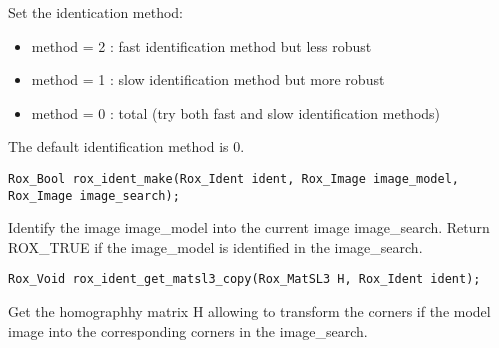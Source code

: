 \noindent Set the identication method:
\begin{itemize}
\item method = 2 : fast identification method but less robust
\item method = 1 : slow identification method but more robust
\item method = 0 : total (try both fast and slow identification methods)
\end{itemize}
The default identification method is 0.

\begin{lstlisting}
Rox_Bool rox_ident_make(Rox_Ident ident, Rox_Image image_model, Rox_Image image_search);
\end{lstlisting}

\noindent Identify the image image\_model into the current image image\_search. Return ROX\_TRUE if the image\_model is identified in the image\_search.

\begin{lstlisting}
Rox_Void rox_ident_get_matsl3_copy(Rox_MatSL3 H, Rox_Ident ident);
\end{lstlisting}

\noindent Get the homographhy matrix H allowing to transform the corners if the model image into the corresponding corners in the image\_search.
